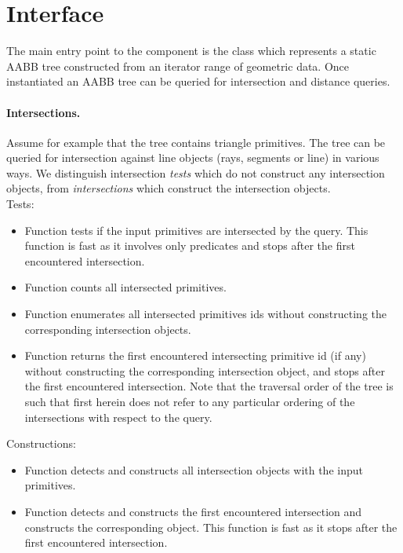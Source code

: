 \section{Interface}
\label{AABB_tree_section_interface}

The main entry point to the component is the class  which represents a static AABB tree constructed from an iterator range of geometric data. Once instantiated an AABB tree can be queried for intersection and distance queries.\\



\paragraph{Intersections.} Assume for example that the tree contains triangle primitives. The tree can be queried for intersection against line objects (rays, segments or line) in various ways. We distinguish intersection \emph{tests} which do not construct any intersection objects, from \emph{intersections} which construct the intersection objects.\\

Tests:
\begin{itemize}
\item Function  tests if the input primitives are intersected by the query. This function is fast as it involves only predicates and stops after the first encountered intersection.
\item Function  counts all intersected primitives.
\item Function  enumerates all intersected primitives ids without constructing the corresponding intersection objects.
\item Function  returns the first encountered intersecting primitive id (if any) without constructing the corresponding intersection object, and stops after the first encountered intersection. Note that the traversal order of the tree is such that first herein does not refer to any particular ordering of the intersections with respect to the query.
\end{itemize}



Constructions:
\begin{itemize}
\item Function  detects and constructs all intersection objects with the input primitives.
\item Function  detects and constructs the first encountered intersection and constructs the corresponding object. This function is fast as it stops after the first encountered intersection.
\end{itemize}



